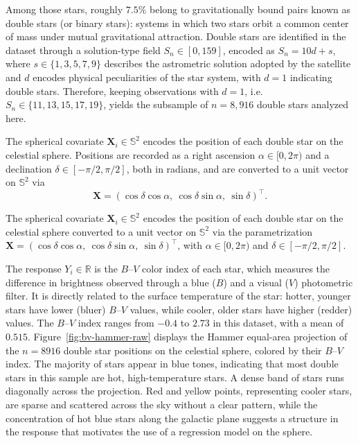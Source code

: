 \documentclass[12pt]{report} %
\newcommand{\bX}{\mathbf{X}}
\begin{document}
Among those stars, roughly $7.5\%$ belong to gravitationally bound pairs known as double stars (or binary stars): systems in which two stars orbit a common center of mass under mutual gravitational attraction. Double stars are identified in the dataset through a solution-type field $S_n \in [0, 159]$, encoded as $S_n = 10d + s$, where $s \in \{1, 3, 5, 7, 9\}$ describes the astrometric solution adopted by the satellite and $d$ encodes physical peculiarities of the 
star system, with $d = 1$ indicating double stars. Therefore, keeping observations with $d = 1$, i.e.\ $S_n \in \{11, 13, 15, 17, 19\}$, yields the subsample of $n = 8{,}916$ double stars analyzed here.

The spherical covariate $\bX_i \in \mathbb{S}^2$ encodes the position of each  double star on the celestial sphere. Positions are recorded as a right ascension $\alpha \in [0, 2\pi)$ and a declination $\delta \in [-\pi/2, \pi/2]$, both in radians, and are converted to a unit vector on $\mathbb{S}^2$ via
\begin{equation*}
    \bX = (\cos\delta\cos\alpha,\ \cos\delta\sin\alpha,\ \sin\delta)^\top.
\end{equation*}


The spherical covariate $\bX_i \in \mathbb{S}^2$ encodes the position of each 
double star on the celestial sphere converted to a unit vector on $\mathbb{S}^2$ via the 
parametrization $\bX = (\cos\delta\cos\alpha,\ \cos\delta\sin\alpha,\ 
\sin\delta)^\top$, with
$\alpha \in [0, 2\pi)$ and $\delta \in [-\pi/2, \pi/2]$. 

The response $Y_i \in \mathbb{R}$ is the $B$--$V$ color index of each star, which measures 
the difference in brightness observed through a blue ($B$) and a visual ($V$) photometric 
filter. It is directly related to the surface temperature of the star: hotter, younger stars 
have lower (bluer) $B$--$V$ values, while cooler, older stars have higher (redder) values. The $B$--$V$ index ranges from $-0.4$ to $2.73$ in this dataset, with a mean of $0.515$. Figure~\ref{fig:bv-hammer-raw} displays the Hammer equal-area projection of the $n = 8916$ double star positions on the celestial sphere, colored by their $B$--$V$ 
index. The majority of stars appear in blue tones, indicating that most double stars in 
this sample are hot, high-temperature stars. A dense band of stars runs diagonally across 
the projection. Red and yellow points, representing cooler stars, are sparse and scattered across the sky without a clear pattern, while the concentration of hot blue stars along the galactic plane suggests a structure in the response that motivates the 
use of a regression model on the sphere.
\end{document}
